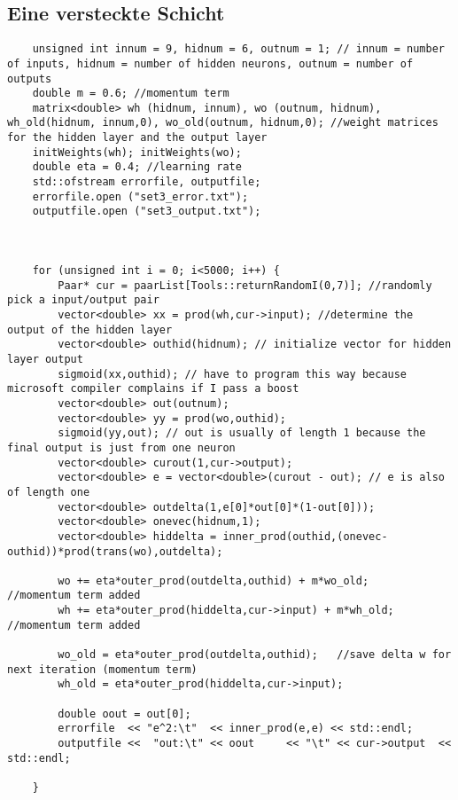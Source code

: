 \documentclass[10pt]{article}
\begin{document}
\subsection{Eine versteckte Schicht}
\begin{lstlisting}
	unsigned int innum = 9, hidnum = 6, outnum = 1; // innum = number of inputs, hidnum = number of hidden neurons, outnum = number of outputs
	double m = 0.6; //momentum term
	matrix<double> wh (hidnum, innum), wo (outnum, hidnum), wh_old(hidnum, innum,0), wo_old(outnum, hidnum,0); //weight matrices for the hidden layer and the output layer
	initWeights(wh); initWeights(wo);
	double eta = 0.4; //learning rate
	std::ofstream errorfile, outputfile;
	errorfile.open ("set3_error.txt");
	outputfile.open ("set3_output.txt");
	
	

	for (unsigned int i = 0; i<5000; i++) {
		Paar* cur = paarList[Tools::returnRandomI(0,7)]; //randomly pick a input/output pair
		vector<double> xx = prod(wh,cur->input); //determine the output of the hidden layer
		vector<double> outhid(hidnum); // initialize vector for hidden layer output
		sigmoid(xx,outhid); // have to program this way because microsoft compiler complains if I pass a boost
		vector<double> out(outnum);
		vector<double> yy = prod(wo,outhid);
		sigmoid(yy,out); // out is usually of length 1 because the final output is just from one neuron
		vector<double> curout(1,cur->output);
		vector<double> e = vector<double>(curout - out); // e is also of length one
		vector<double> outdelta(1,e[0]*out[0]*(1-out[0]));
		vector<double> onevec(hidnum,1);
		vector<double> hiddelta = inner_prod(outhid,(onevec-outhid))*prod(trans(wo),outdelta);

		wo += eta*outer_prod(outdelta,outhid) + m*wo_old;       //momentum term added
		wh += eta*outer_prod(hiddelta,cur->input) + m*wh_old;   //momentum term added

		wo_old = eta*outer_prod(outdelta,outhid);   //save delta w for next iteration (momentum term)
		wh_old = eta*outer_prod(hiddelta,cur->input);				
		
		double oout = out[0];
		errorfile  << "e^2:\t"  << inner_prod(e,e) << std::endl;
		outputfile <<  "out:\t" << oout     << "\t" << cur->output  << std::endl;

	}
\end{lstlisting}
\end{document}
